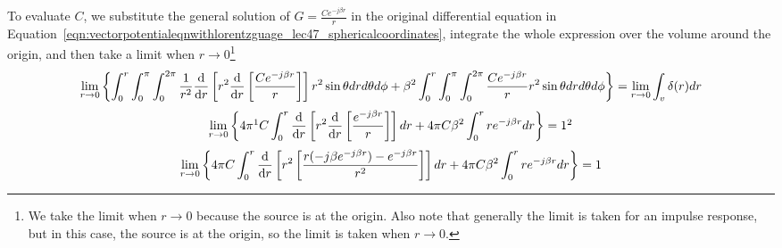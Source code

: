 To evaluate $C$, we substitute the general solution of $G = \frac{Ce^{-j\beta r}}{r}$ in the original differential equation in Equation~\eqref{eqn:vectorpotentialeqnwithlorentzguage_lec47_sphericalcoordinates}, integrate the whole expression over the volume around the origin, and then take a limit when $r\rightarrow0$\footnote{
We take the limit when $r\rightarrow0$ because the source is at the origin. Also note that generally the limit is taken for an impulse response, but in this case, the source is at the origin, so the limit is taken when $r\rightarrow0$.
}
\begin{dmath*}
\lim\limits_{r\rightarrow0} \left\lbrace \int_{0}^{r} \int_{0}^{\pi}\int_{0}^{2\pi}\frac{1}{r^{2}}\derivative{}{r}\left[{r^{2}}\derivative{}{r}\left[\frac{Ce^{-j\beta r}}{r}\right]\right]r^{2}\sin\theta dr d\theta d\phi + \beta^{2} \int_{0}^{r} \int_{0}^{\pi}\int_{0}^{2\pi}\frac{Ce^{-j\beta r}}{r}r^{2}\sin\theta drd\theta d\phi\right\rbrace
= \lim\limits_{r\rightarrow0}\int_{v}\delta(r)dr
\end{dmath*}
\begin{dmath*}
\lim\limits_{r\rightarrow0}\left\lbrace 4\pi\footnotemark C\int_{0}^{r}\derivative{}{r}\left[{r^{2}}\derivative{}{r}\left[\frac{e^{-j\beta r}}{r}\right]\right]dr + 4\pi C\beta^{2}\int_{0}^{r}re^{-j\beta r}dr \right\rbrace = 1\footnotemark
\end{dmath*}
\begin{dmath*}
\lim\limits_{r\rightarrow0}\left\lbrace4\pi C\int_{0}^{r}\derivative{}{r}\left[{r^{2}}\left[\frac{r(-j\beta e^{-j\beta r}) - e^{-j\beta r}}{r^{2}}\right]\right]dr + 4\pi C\beta^{2}\int_{0}^{r}re^{-j\beta r}dr \right\rbrace = 1
\end{dmath*}
